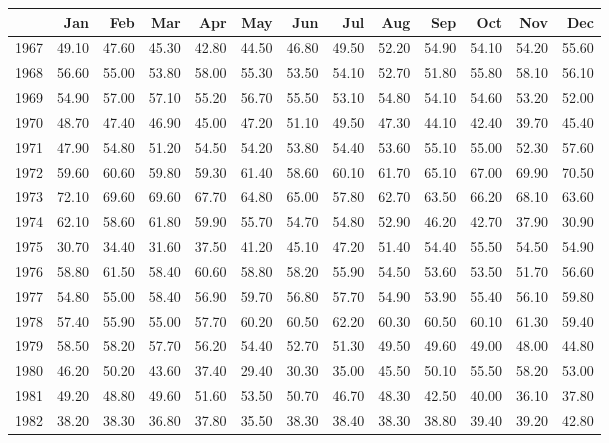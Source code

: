 \begin{longtable}{rrrrrrrrrrrrr}
  \hline
 & Jan & Feb & Mar & Apr & May & Jun & Jul & Aug & Sep & Oct & Nov & Dec \\ 
  \hline
1967 & 49.10 & 47.60 & 45.30 & 42.80 & 44.50 & 46.80 & 49.50 & 52.20 & 54.90 & 54.10 & 54.20 & 55.60 \\ 
  1968 & 56.60 & 55.00 & 53.80 & 58.00 & 55.30 & 53.50 & 54.10 & 52.70 & 51.80 & 55.80 & 58.10 & 56.10 \\ 
  1969 & 54.90 & 57.00 & 57.10 & 55.20 & 56.70 & 55.50 & 53.10 & 54.80 & 54.10 & 54.60 & 53.20 & 52.00 \\ 
  1970 & 48.70 & 47.40 & 46.90 & 45.00 & 47.20 & 51.10 & 49.50 & 47.30 & 44.10 & 42.40 & 39.70 & 45.40 \\ 
  1971 & 47.90 & 54.80 & 51.20 & 54.50 & 54.20 & 53.80 & 54.40 & 53.60 & 55.10 & 55.00 & 52.30 & 57.60 \\ 
  1972 & 59.60 & 60.60 & 59.80 & 59.30 & 61.40 & 58.60 & 60.10 & 61.70 & 65.10 & 67.00 & 69.90 & 70.50 \\ 
  1973 & 72.10 & 69.60 & 69.60 & 67.70 & 64.80 & 65.00 & 57.80 & 62.70 & 63.50 & 66.20 & 68.10 & 63.60 \\ 
  1974 & 62.10 & 58.60 & 61.80 & 59.90 & 55.70 & 54.70 & 54.80 & 52.90 & 46.20 & 42.70 & 37.90 & 30.90 \\ 
  1975 & 30.70 & 34.40 & 31.60 & 37.50 & 41.20 & 45.10 & 47.20 & 51.40 & 54.40 & 55.50 & 54.50 & 54.90 \\ 
  1976 & 58.80 & 61.50 & 58.40 & 60.60 & 58.80 & 58.20 & 55.90 & 54.50 & 53.60 & 53.50 & 51.70 & 56.60 \\ 
  1977 & 54.80 & 55.00 & 58.40 & 56.90 & 59.70 & 56.80 & 57.70 & 54.90 & 53.90 & 55.40 & 56.10 & 59.80 \\ 
  1978 & 57.40 & 55.90 & 55.00 & 57.70 & 60.20 & 60.50 & 62.20 & 60.30 & 60.50 & 60.10 & 61.30 & 59.40 \\ 
  1979 & 58.50 & 58.20 & 57.70 & 56.20 & 54.40 & 52.70 & 51.30 & 49.50 & 49.60 & 49.00 & 48.00 & 44.80 \\ 
  1980 & 46.20 & 50.20 & 43.60 & 37.40 & 29.40 & 30.30 & 35.00 & 45.50 & 50.10 & 55.50 & 58.20 & 53.00 \\ 
  1981 & 49.20 & 48.80 & 49.60 & 51.60 & 53.50 & 50.70 & 46.70 & 48.30 & 42.50 & 40.00 & 36.10 & 37.80 \\ 
  1982 & 38.20 & 38.30 & 36.80 & 37.80 & 35.50 & 38.30 & 38.40 & 38.30 & 38.80 & 39.40 & 39.20 & 42.80 \\ 

\end{longtable}
